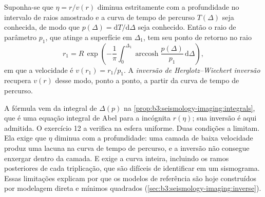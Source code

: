 \begin{omfigure}
\par{}
\label{fig:b3:seismology-imaging:tt}
\end{omfigure}

\begin{proposition}\label{prop:b3:seismology-imaging:herglotz}
Suponha-se que $\eta = r/v(r)$ diminua estritamente com a profundidade no intervalo de raios amostrado
e a curva de tempo de percurso $T(\Delta)$ seja conhecida, de modo que $p(\Delta) =
\mathrm dT/\mathrm d\Delta$ seja conhecido. Então o raio de parâmetro $p_1$, que
atinge a superfície em $\Delta_1$, tem seu ponto de retorno no raio
\[
  r_1 = R\,\exp\!\left(-\frac1\pi\int_0^{\Delta_1}
  \operatorname{arccosh}\frac{p(\Delta)}{p_1}\,\mathrm d\Delta\right),
\]
em que a velocidade é $v(r_1) = r_1/p_1$. A \emph{inversão de Herglotz--Wiechert
inversão} recupera $v(r)$ desse modo,
ponto a ponto, a partir da curva de tempo de percurso.
\end{proposition}
\admitted

A fórmula vem da integral de $\Delta(p)$ na
\cref{prop:b3:seismology-imaging:integrals}, que é uma equação integral de Abel para a
incógnita $r(\eta)$; sua inversão é aqui admitida.
O exercício 12 a verifica na esfera uniforme. Duas condições a limitam. Ela exige que
$\eta$ diminua com a profundidade: uma camada de baixa velocidade produz uma lacuna na
curva de tempo de percurso, e a inversão não consegue enxergar dentro da camada. E exige
a curva inteira, incluindo os ramos posteriores de cada triplicação, que são difíceis de
identificar em um sismograma. Essas limitações explicam por que os modelos de referência
são hoje construídos por modelagem direta e mínimos quadrados (\cref{sec:b3:seismology-imaging:inverse}).

